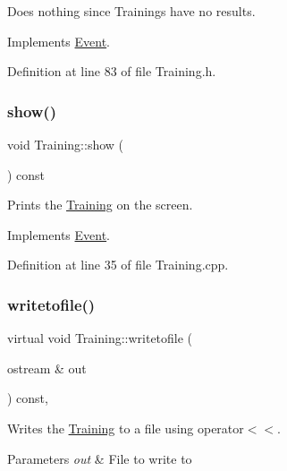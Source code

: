 Does nothing since Trainings have no results. 



Implements \hyperlink{class_event_a5ddb261642035be78677d668f9238339}{Event}.



Definition at line 83 of file Training.\+h.

\hypertarget{class_training_a9391fa1f4862855341d6243e75f9efef}{}\label{class_training_a9391fa1f4862855341d6243e75f9efef} 
\subsubsection{\texorpdfstring{show()}{show()}}
{\footnotesize\ttfamily void Training\+::show (\begin{DoxyParamCaption}{ }\end{DoxyParamCaption}) const\hspace{0.3cm}{\ttfamily [virtual]}}



Prints the \hyperlink{class_training}{Training} on the screen. 



Implements \hyperlink{class_event_af53c2db83404a045087a271ed3c2604f}{Event}.



Definition at line 35 of file Training.\+cpp.

\hypertarget{class_training_a1755abc9faafbe06fb2825cb5f879016}{}\label{class_training_a1755abc9faafbe06fb2825cb5f879016} 
\subsubsection{\texorpdfstring{writetofile()}{writetofile()}}
{\footnotesize\ttfamily virtual void Training\+::writetofile (\begin{DoxyParamCaption}\item[{ostream \&}]{out }\end{DoxyParamCaption}) const\hspace{0.3cm}{\ttfamily [inline]}, {\ttfamily [virtual]}}



Writes the \hyperlink{class_training}{Training} to a file using operator$<$$<$. 


\begin{DoxyParams}{Parameters}
{\em out} & File to write to \\
\hline
\end{DoxyParams}


